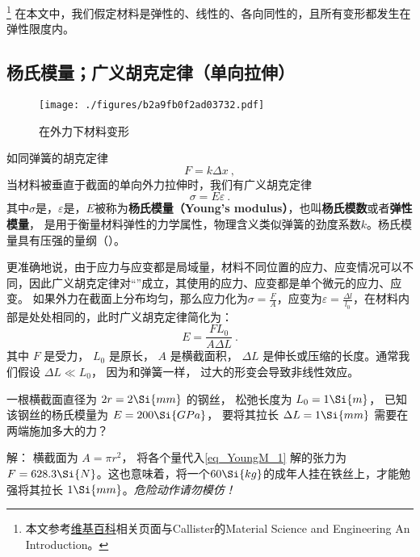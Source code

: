 
\begin{issues}
\issueDraft
\end{issues}

\footnote{本文参考\href{https://en.wikipedia.org/wiki/Young's_modulus}{维基百科}相关页面与Callister的Material Science and Engineering An Introduction。}
在本文中，我们假定材料是弹性的、线性的、各向同性的，且所有变形都发生在弹性限度内。

\subsection{杨氏模量；广义胡克定律（单向拉伸）}
\begin{figure}[ht]
\centering
\texttt{[image: ./figures/b2a9fb0f2ad03732.pdf]}
\caption{在外力下材料变形} \label{fig_YoungM_1}
\end{figure}

如同弹簧的胡克定律
$$F=k \Delta x~,$$
当材料被垂直于截面的单向外力拉伸时，我们有广义胡克定律
\begin{equation}
\sigma = E \varepsilon~.
\end{equation}
其中$\sigma$是，$\varepsilon$是，$E$被称为\textbf{杨氏模量（Young's modulus）}，也叫\textbf{杨氏模数}或者\textbf{弹性模量}， 是用于衡量材料弹性的力学属性，物理含义类似弹簧的劲度系数$k$。杨氏模量具有压强的量纲（）。

更准确地说，由于应力与应变都是局域量，材料不同位置的应力、应变情况可以不同，因此广义胡克定律对“”成立，其使用的应力、应变都是单个微元的应力、应变。%
如果外力在截面上分布均匀，那么应力化为$\sigma=\frac{F}{A}$，应变为$\varepsilon=\frac{\Delta l}{l_0}$，在材料内部是处处相同的，此时广义胡克定律简化为：%
\begin{equation}\label{eq_YoungM_1}
E = \frac{FL_0}{A\Delta L}~.
\end{equation}
其中 $F$ 是受力， $L_0$ 是原长， $A$ 是横截面积， $\Delta L$ 是伸长或压缩的长度。通常我们假设 $\Delta L \ll L_0$， 因为和弹簧一样， 过大的形变会导致非线性效应。

\begin{example}{}
一根横截面直径为 $2r = 2\Si{mm}$ 的钢丝， 松弛长度为 $L_0 = 1\Si{m}$， 已知该钢丝的杨氏模量为 $E = 200\Si{GPa}$， 要将其拉长 $\Delta L = 1\Si{mm}$ 需要在两端施加多大的力？

解： 横截面为 $A = \pi r^2$， 将各个量代入\autoref{eq_YoungM_1} 解的张力为 $F = 628.3\Si{N}$。这也意味着，将一个$60 \Si{kg}$的成年人挂在铁丝上，才能勉强将其拉长 $1\Si{mm}$。\textsl{危险动作请勿模仿！}
\end{example}

